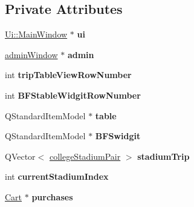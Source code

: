 \subsection*{Private Attributes}
\begin{DoxyCompactItemize}
\item 
\mbox{\label{class_main_window_a35466a70ed47252a0191168126a352a5}} 
\hyperlink{class_ui_1_1_main_window}{Ui\+::\+Main\+Window} $\ast$ {\bfseries ui}
\item 
\mbox{\label{class_main_window_a86bf1caf2fb7f33313c6666c9621f2bb}} 
\hyperlink{classadmin_window}{admin\+Window} $\ast$ {\bfseries admin}
\item 
\mbox{\label{class_main_window_a14e45697dcf41d51d7c7b897115f37ec}} 
int {\bfseries trip\+Table\+View\+Row\+Number}
\item 
\mbox{\label{class_main_window_aaa04d341765d51fa0fa21099b3332151}} 
int {\bfseries B\+F\+Stable\+Widgit\+Row\+Number}
\item 
\mbox{\label{class_main_window_ab404f01fde474411e4db9f48a597933b}} 
Q\+Standard\+Item\+Model $\ast$ {\bfseries table}
\item 
\mbox{\label{class_main_window_a455b66a7c7955b81e4413b2de6ed365f}} 
Q\+Standard\+Item\+Model $\ast$ {\bfseries B\+F\+Swidgit}
\item 
\mbox{\label{class_main_window_a64858232db731ca5b8176f44c3d8449b}} 
Q\+Vector$<$ \hyperlink{structcollege_stadium_pair}{college\+Stadium\+Pair} $>$ {\bfseries stadium\+Trip}
\item 
\mbox{\label{class_main_window_af80069d0c00ad7e1c9ad338679176617}} 
int {\bfseries current\+Stadium\+Index}
\item 
\mbox{\label{class_main_window_a26b6b2c19d6ed3714dd32945e86fff4c}} 
\hyperlink{class_cart}{Cart} $\ast$ {\bfseries purchases}
\item 
\mbox{\label{class_main_window_a4b44a975e1f8ead51f450c55bbcea363}} 

\end{DoxyCompactItemize}
